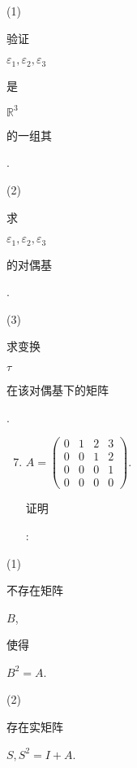\documentclass[10pt]{article}
\begin{document}
(1) \begin{CJK}{UTF8}{mj}验证\end{CJK} $\varepsilon_{1}, \varepsilon_{2}, \varepsilon_{3}$ \begin{CJK}{UTF8}{mj}是\end{CJK} $\mathbb{R}^{3}$ \begin{CJK}{UTF8}{mj}的一组其\end{CJK}.

(2) \begin{CJK}{UTF8}{mj}求\end{CJK} $\varepsilon_{1}, \varepsilon_{2}, \varepsilon_{3}$ \begin{CJK}{UTF8}{mj}的对偶基\end{CJK}.

(3) \begin{CJK}{UTF8}{mj}求变换\end{CJK} $\tau$ \begin{CJK}{UTF8}{mj}在该对偶基下的矩阵\end{CJK}.

\begin{enumerate}
  \setcounter{enumi}{6}
  \item $A=\left(\begin{array}{llll}0 & 1 & 2 & 3 \\ 0 & 0 & 1 & 2 \\ 0 & 0 & 0 & 1 \\ 0 & 0 & 0 & 0\end{array}\right)$. \begin{CJK}{UTF8}{mj}证明\end{CJK}:
\end{enumerate}
(1) \begin{CJK}{UTF8}{mj}不存在矩阵\end{CJK} $B$, \begin{CJK}{UTF8}{mj}使得\end{CJK} $B^{2}=A$.

(2) \begin{CJK}{UTF8}{mj}存在实矩阵\end{CJK} $S, S^{2}=I+A$.
\end{document}
